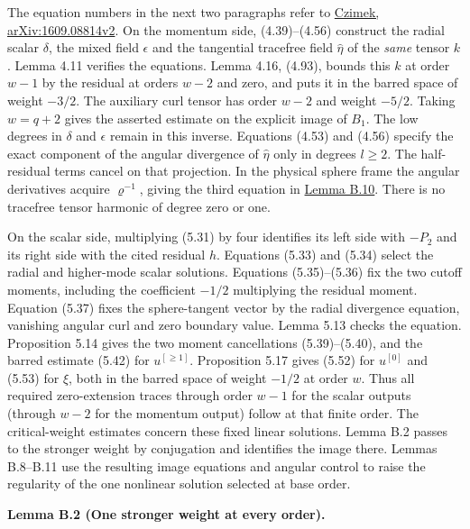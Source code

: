\documentclass[
  english,
  11pt,
  reqno]{amsart}
\makeatletter
\newcommand{\pandocstatementheading}[1]{%
  \par\if@nobreak\else
    \addpenalty{\@beginparpenalty}%
    \addvspace{.5\baselineskip plus .2\baselineskip minus .2\baselineskip}%
  \fi
  {\normalfont\bfseries #1\par}%
  \nobreak\@afterindenttrue\@afterheading
}
\makeatother
\begin{document}
The equation numbers in the next two paragraphs refer to
\href{https://arxiv.org/pdf/1609.08814v2}{Czimek, arXiv:1609.08814v2}.
On the momentum side, (4.39)--(4.56) construct the radial scalar
\(\delta\), the mixed field \(\epsilon\) and the tangential tracefree
field \(\widehat\eta\) of the \emph{same} tensor \(k\). Lemma 4.11
verifies the equations. Lemma 4.16, (4.93), bounds this \(k\) at order
\(w-1\) by the residual at orders \(w-2\) and zero, and puts it in the
barred space of weight \(-3/2\). The auxiliary curl tensor has order
\(w-2\) and weight \(-5/2\). Taking \(w=q+2\) gives the asserted
estimate on the explicit image of \(B_1\). The low degrees in \(\delta\)
and \(\epsilon\) remain in this inverse. Equations (4.53) and (4.56)
specify the exact component of the angular divergence of
\(\widehat\eta\) only in degrees \(l\ge2\). The half-residual terms
cancel on that projection. In the physical sphere frame the angular
derivatives acquire \(\varrho^{-1}\), giving the third equation in
\hyperref[eq:online-momentum-radial-divergence]{Lemma B.10}. There is no
tracefree tensor harmonic of degree zero or one.

On the scalar side, multiplying (5.31) by four identifies its left side
with \(-P_2\) and its right side with the cited residual \(h\).
Equations (5.33) and (5.34) select the radial and higher-mode scalar
solutions. Equations (5.35)--(5.36) fix the two cutoff moments,
including the coefficient \(-1/2\) multiplying the residual moment.
Equation (5.37) fixes the sphere-tangent vector by the radial divergence
equation, vanishing angular curl and zero boundary value. Lemma 5.13
checks the equation. Proposition 5.14 gives the two moment cancellations
(5.39)--(5.40), and the barred estimate (5.42) for \(u^{[\ge1]}\).
Proposition 5.17 gives (5.52) for \(u^{[0]}\) and (5.53) for \(\xi\),
both in the barred space of weight \(-1/2\) at order \(w\). Thus all
required zero-extension traces through order \(w-1\) for the scalar
outputs (through \(w-2\) for the momentum output) follow at that finite
order. The critical-weight estimates concern these fixed linear
solutions. Lemma B.2 passes to the stronger weight by conjugation and
identifies the image there. Lemmas B.8--B.11 use the resulting image
equations and angular control to raise the regularity of the one
nonlinear solution selected at base order.

\pandocstatementheading{\leavevmode{}\label{lem:online-extension-stronger-weight-inverse}Lemma B.2 (One stronger weight at every order).}
\end{document}
